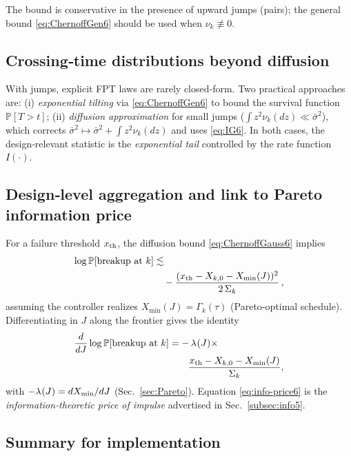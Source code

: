 \documentclass[aps,pre,twocolumn,showpacs,superscriptaddress]{revtex4-2}
\theoremstyle{definition}
\newcommand{\PP}{\mathbb{P}}
\begin{document}
\noindent The bound is conservative in the presence of upward jumps (pairs); the general bound \eqref{eq:ChernoffGen6} should be used when $\nu_k\not\equiv 0$.

\subsection{Crossing‑time distributions beyond diffusion}\label{subsec:FPTjump6}

With jumps, explicit FPT laws are rarely closed‑form. Two practical approaches are: (i) \emph{exponential tilting} via \eqref{eq:ChernoffGen6} to bound the survival function $\PP[T>t]$; (ii) \emph{diffusion approximation} for small jumps ($\int z^2\nu_k(dz)\ll \bar\sigma^2$), which corrects $\bar\sigma^2\mapsto \bar\sigma^2+\int z^2\nu_k(dz)$ and uses \eqref{eq:IG6}. In both cases, the design‑relevant statistic is the \emph{exponential tail} controlled by the rate function $I(\cdot)$.

\subsection{Design‑level aggregation and link to Pareto information price}\label{subsec:link5-6}

For a failure threshold $x_{\rm th}$, the diffusion bound \eqref{eq:ChernoffGauss6} implies
\begin{align}
\log \PP[\text{breakup at }k] &\lesssim \nonumber\\
&\quad -\frac{(x_{\rm th}-X_{k,0}-X_{\min}(J))^2}{2\,\Sigma_k}\,,
\end{align}
assuming the controller realizes $X_{\min}(J)=\Gamma_k(\tau)$ (Pareto‑optimal schedule). Differentiating in $J$ along the frontier gives the identity
\begin{align}\label{eq:info-price6}
\frac{d}{dJ}\log \PP[\text{breakup at }k] &= -\,\lambda^{\*}(J)\times\nonumber\\
&\quad\quad\frac{x_{\rm th}-X_{k,0}-X_{\min}(J)}{\Sigma_k},
\end{align}
with $-\lambda^{\*}(J)=dX_{\min}/dJ$ (Sec.~\ref{sec:Pareto}). Equation \eqref{eq:info-price6} is the \emph{information‑theoretic price of impulse} advertised in Sec.~\ref{subsec:info5}.

\subsection{Summary for implementation}\label{subsec:summary6}
\end{document}
